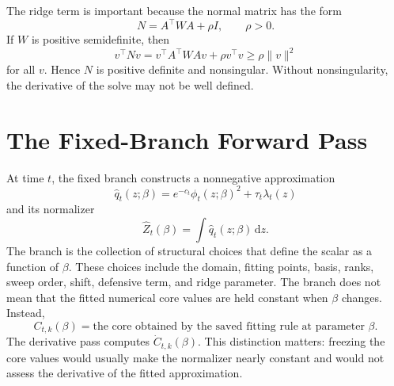 \documentclass[11pt]{article}
\newcommand{\dd}{\,\mathrm d}
\begin{document}
The ridge term is important because the normal matrix has the form
\[
    N=A^\top W A+\rho I,
    \qquad \rho>0.
    \label{eq:p24-p19-42}
\]
If \(W\) is positive semidefinite, then
\[
    v^\top N v
    =
    v^\top A^\top W A v+\rho v^\top v
    \ge
    \rho\|v\|^2
    \label{eq:p24-p19-43}
\]
for all \(v\).  Hence \(N\) is positive definite and nonsingular.  Without
nonsingularity, the derivative of the solve may not be well defined.

\section{The Fixed-Branch Forward Pass}

At time \(t\), the fixed branch constructs a nonnegative approximation
\[
    \widehat q_t(z;\beta)
    =
    e^{-c_t}\phi_t(z;\beta)^2+\tau_t\lambda_t(z)
    \label{eq:p24-p19-44}
\]
and its normalizer
\[
    \widehat Z_t(\beta)=\int \widehat q_t(z;\beta)\dd z.
    \label{eq:p24-p19-45}
\]
The branch is the collection of structural choices that define the scalar as a
function of \(\beta\).  These choices include the domain, fitting points, basis,
ranks, sweep order, shift, defensive term, and ridge parameter.  The branch does
not mean that the fitted numerical core values are held constant when
\(\beta\) changes.  Instead,
\[
    C_{t,k}(\beta)
    =
    \text{the core obtained by the saved fitting rule at parameter }\beta.
    \label{eq:p24-p19-45a}
\]
The derivative pass computes \(\dot C_{t,k}(\beta)\).  This distinction matters:
freezing the core values would usually make the normalizer nearly constant and
would not assess the derivative of the fitted approximation.
\end{document}
